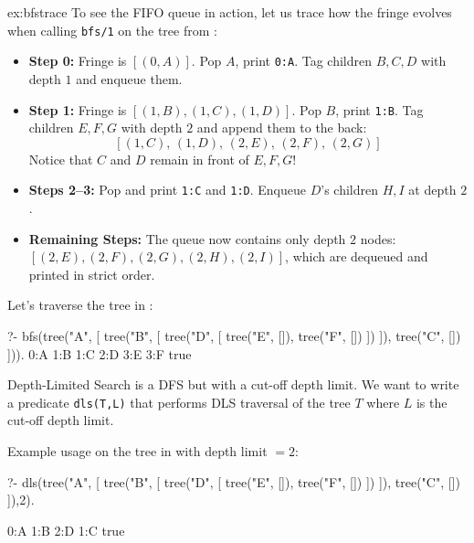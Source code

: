 \begin{example}{ex:bfstrace}
To see the FIFO queue in action, let us trace how the fringe evolves when calling \texttt{bfs/1} on the tree from :
\begin{itemize}
    \item \textbf{Step 0:} Fringe is $[(0, A)]$. Pop $A$, print \texttt{0:A}. Tag children $B, C, D$ with depth $1$ and enqueue them.
    \item \textbf{Step 1:} Fringe is $[(1, B), (1, C), (1, D)]$. Pop $B$, print \texttt{1:B}. Tag children $E, F, G$ with depth $2$ and append them to the back:
    \[
    [(1, C),\, (1, D),\, (2, E),\, (2, F),\, (2, G)]
    \]
    Notice that $C$ and $D$ remain in front of $E, F, G$!
    \item \textbf{Steps 2--3:} Pop and print \texttt{1:C} and \texttt{1:D}. Enqueue $D$'s children $H, I$ at depth $2$.
    \item \textbf{Remaining Steps:} The queue now contains only depth $2$ nodes: $[(2, E), (2, F), (2, G), (2, H), (2, I)]$, which are dequeued and printed in strict order.
\end{itemize}
\end{example}

Let's traverse the tree in :

\begin{codeblock}
?- bfs(tree("A",
         [ tree("B",
                [ tree("D",
                       [ tree("E", []),
                         tree("F", [])
                       ])
                ]),
           tree("C", [])
         ])).
0:A
1:B
1:C
2:D
3:E
3:F
true
\end{codeblock}

Depth-Limited Search is a DFS but with a cut-off depth limit. We want to write a predicate \texttt{dls(T,L)} that performs DLS traversal of the tree $T$ where $L$ is the cut-off depth limit.

Example usage on the tree in  with depth limit $=2$:
\begin{codeblock}
?- dls(tree("A",
         [ tree("B",
                [ tree("D",
                       [ tree("E", []),
                         tree("F", [])
                       ])
                ]),
           tree("C", [])
         ]),2).

0:A
1:B
2:D
1:C
true
\end{codeblock}



